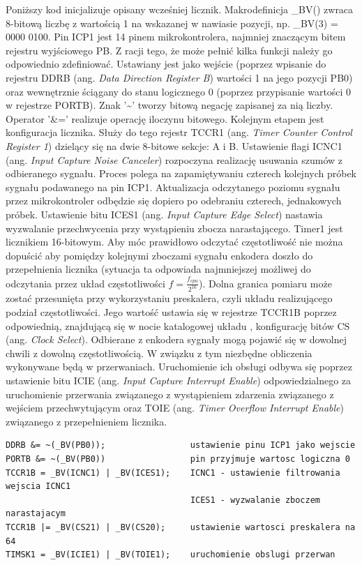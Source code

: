   Poniższy kod inicjalizuje opisany wcześniej licznik. Makrodefinicja \_BV() zwraca 8-bitową liczbę z wartością 1 na wskazanej w nawiasie pozycji, np. \_BV(3) = 0000 0100. Pin ICP1 jest 14 pinem mikrokontrolera, najmniej znaczącym bitem rejestru wyjściowego PB. Z racji tego, że może pełnić kilka funkcji należy go odpowiednio zdefiniować. Ustawiany jest jako wejście (poprzez wpisanie do rejestru DDRB (ang. \textit{Data Direction Register B}) wartości 1 na jego pozycji PB0) oraz wewnętrznie ściągany do stanu logicznego 0 (poprzez przypisanie wartości 0 w rejestrze PORTB). Znak '\textasciitilde' tworzy bitową negację zapisanej za nią liczby. Operator '\&=' realizuje operację iloczynu bitowego. Kolejnym etapem jest konfiguracja licznika. Służy do tego rejestr TCCR1 (ang. \textit{Timer Counter Control Register 1}) dzielący się na dwie 8-bitowe sekcje: A i B. Ustawienie flagi ICNC1 (ang. \textit{Input Capture Noise Canceler}) rozpoczyna realizację usuwania szumów z odbieranego sygnału. Proces polega na zapamiętywaniu czterech kolejnych próbek sygnału podawanego na pin ICP1. Aktualizacja odczytanego poziomu sygnału przez mikrokontroler odbędzie się dopiero po odebraniu czterech, jednakowych próbek. Ustawienie bitu ICES1 (ang. \textit{Input Capture Edge Select}) nastawia wyzwalanie przechwycenia przy wystąpieniu zbocza narastającego. Timer1 jest licznikiem 16-bitowym. Aby móc prawidłowo odczytać częstotliwość nie można dopuścić aby pomiędzy kolejnymi zboczami sygnału enkodera doszło do przepełnienia licznika (sytuacja ta odpowiada najmniejszej możliwej do odczytania przez układ częstotliwości $f=\frac{f_{cpu}}{2^{16}}$).
Dolna granica pomiaru może zostać przesunięta przy wykorzystaniu preskalera, czyli układu realizującego podział częstotliwości. Jego wartość ustawia się w rejestrze TCCR1B poprzez odpowiednią, znajdującą się w nocie katalogowej układu \cite{nota}, konfigurację bitów CS (ang. \textit{Clock Select}). Odbierane z enkodera sygnały mogą pojawić się w dowolnej chwili z dowolną częstotliwością. W związku z tym niezbędne obliczenia wykonywane będą w przerwaniach. Uruchomienie ich obsługi odbywa się poprzez ustawienie bitu ICIE (ang. \textit{Input Capture Interrupt Enable}) odpowiedzialnego za uruchomienie przerwania związanego z wystąpieniem zdarzenia związanego z wejściem przechwytującym oraz TOIE (ang. \textit{Timer Overflow Interrupt Enable}) związanego z przepełnieniem licznika.
  \begin{lstlisting}
DDRB &= ~(_BV(PB0));                 ustawienie pinu ICP1 jako wejscie 
PORTB &= ~(_BV(PB0))                 pin przyjmuje wartosc logiczna 0
TCCR1B = _BV(ICNC1) | _BV(ICES1);    ICNC1 - ustawienie filtrowania wejscia ICNC1
                                     ICES1 - wyzwalanie zboczem narastajacym 
TCCR1B |= _BV(CS21) | _BV(CS20);     ustawienie wartosci preskalera na 64
TIMSK1 = _BV(ICIE1) | _BV(TOIE1);    uruchomienie obslugi przerwan
\end{lstlisting}

